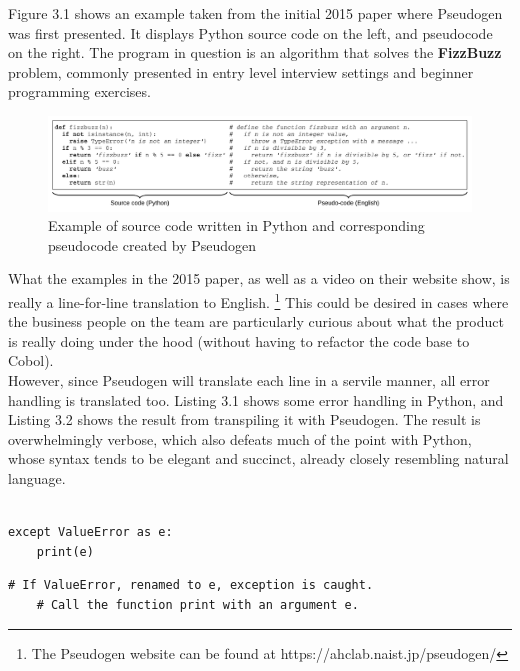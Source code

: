 Figure 3.1 shows an example taken from the initial 2015 paper where Pseudogen was first presented. It displays Python source code on the left, and pseudocode on the right. The program in question is an algorithm that solves the \textbf{FizzBuzz} problem, commonly presented in entry level interview settings and beginner programming exercises. \hfill \\

\begin{figure}[ht]
    \centering
    \includegraphics[scale=0.52]{assets/odaetal.png}
    \caption{Example of source code written in Python and corresponding pseudocode created by Pseudogen}
    \label{fig:odaetal}
\end{figure}

What the examples in the 2015 paper, as well as a video on their website show, is really a line-for-line translation to English. \footnote{The Pseudogen website can be found at https://ahclab.naist.jp/pseudogen/} This could be desired in cases where the business people on the team are particularly curious about what the product is really doing under the hood (without having to refactor the code base to Cobol). \\

However, since Pseudogen will translate each line in a servile manner, all error handling is translated too. Listing 3.1 shows some error handling in Python, and Listing 3.2 shows the result from transpiling it with Pseudogen. The result is overwhelmingly verbose, which also defeats much of the point with Python, whose syntax tends to be elegant and succinct, already closely resembling natural language. \\ \\


\begin{lstlisting}[caption={Error handling in Python}, captionpos=b]
except ValueError as e:
    print(e)
\end{lstlisting}

\begin{lstlisting}[caption={The result of transpiling the code in Listing ?? with Pseudogen}, captionpos=b]
# If ValueError, renamed to e, exception is caught.
    # Call the function print with an argument e.
\end{lstlisting}

